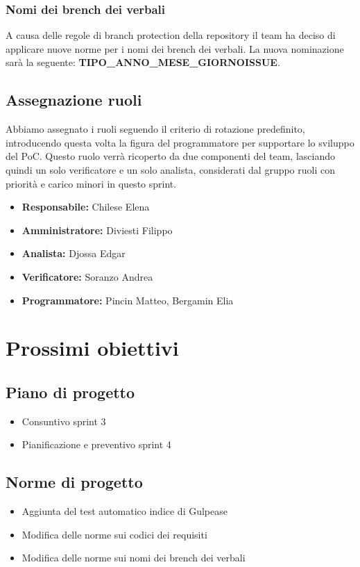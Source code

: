 \subsubsection{Nomi dei brench dei verbali}
A causa delle regole di branch protection della repository il team ha deciso di applicare nuove norme per i nomi dei brench dei verbali.
La nuova nominazione sarà la seguente: \textbf{TIPO\_ANNO\_MESE\_GIORNO\-ISSUE}.

\subsection{Assegnazione ruoli}
Abbiamo assegnato i ruoli seguendo il criterio di rotazione predefinito, introducendo questa volta la figura del programmatore per supportare lo sviluppo del PoC.
Questo ruolo verrà ricoperto da due componenti del team, lasciando quindi un solo verificatore e un solo analista, considerati dal gruppo ruoli con priorità e carico minori in questo sprint.
\begin{itemize}
    \item \textbf{Responsabile:} Chilese Elena
    \item \textbf{Amministratore:} Diviesti Filippo
    \item \textbf{Analista:} Djossa Edgar
    \item \textbf{Verificatore:} Soranzo Andrea
    \item \textbf{Programmatore:} Pincin Matteo, Bergamin Elia
\end{itemize}

\section{Prossimi obiettivi}

\subsection{Piano di progetto}
\begin{itemize}
    \item Consuntivo sprint 3
    \item Pianificazione e preventivo sprint 4
\end{itemize}

\subsection{Norme di progetto}
\begin{itemize}
    \item Aggiunta del test automatico indice di Gulpease
    \item Modifica delle norme sui codici dei requisiti
    \item Modifica delle norme sui nomi dei brench dei verbali
\end{itemize}

